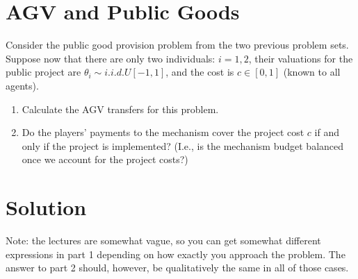 \documentclass[a4paper]{article}
\newif\ifsolutions
\begin{document}
\section{AGV and Public Goods}

Consider the public good provision problem from the two previous problem sets. Suppose now that there are only two individuals: $i=1,2$, their valuations for the public project are $\theta_i \sim i.i.d. U[-1,1]$, and the cost is $c \in [0,1]$ (known to all agents).

\begin{enumerate}
	\item Calculate the AGV transfers for this problem.
	\item Do the players' payments to the mechanism cover the project cost $c$ if and only if the project is implemented? (I.e., is the mechanism budget balanced once we account for the project costs?)
\end{enumerate}

\ifsolutions
\section*{Solution}
Note: the lectures are somewhat vague, so you can get somewhat different expressions in part 1 depending on how exactly you approach the problem. The answer to part 2 should, however, be qualitatively the same in all of those cases.
\end{document}
